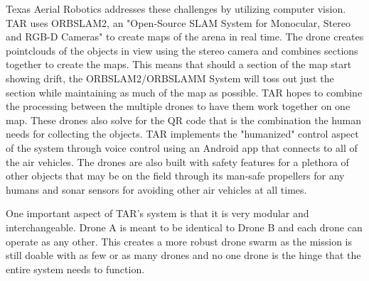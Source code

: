 \documentclass[12pt,letterpaper]{article}
\begin{document}
	Texas Aerial Robotics addresses these challenges by utilizing computer vision. TAR uses ORBSLAM2, an "Open-Source SLAM System for Monocular, Stereo and RGB-D Cameras" to create maps of the arena in real time. The drone creates pointclouds of the objects in view using the stereo camera and combines sections together to create the maps. This means that should a section of the map start showing drift, the ORBSLAM2/ORBSLAMM System will toss out just the section while maintaining as much of the map as possible. TAR hopes to combine the processing between the multiple drones to have them work together on one map. These drones also solve for the QR code that is the combination the human needs for collecting the objects. TAR implements the "humanized" control aspect of the system through voice control using an Android app that connects to all of the air vehicles. The drones are also built with safety features for a plethora of other objects that may be on the field through its man-safe propellers for any humans and sonar sensors for avoiding other air vehicles at all times.

	One important aspect of TAR’s system is that it is very modular and interchangeable. Drone A is meant to be identical to Drone B and each drone can operate as any other. This creates a more robust drone swarm as the mission is still doable with as few or as many drones and no one drone is the hinge that the entire system needs to function. 
\end{document}
